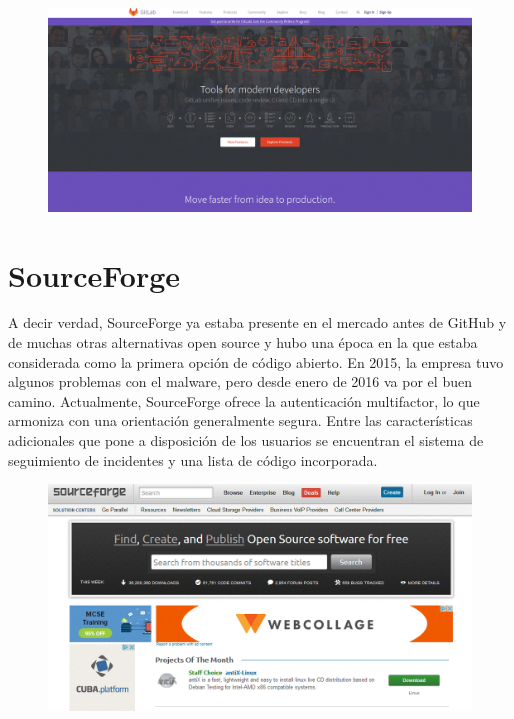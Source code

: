 \documentclass[12pt,letterpaper]{article}
\begin{document}
\vspace*{-0.025in}
\begin{figure}[htb]
\begin{center}
\includegraphics[width=16cm]{./Imagenes/gitlabN}
\end{center}
\end{figure}

\section{SourceForge}
A decir verdad, SourceForge ya estaba presente en el mercado antes de GitHub y de muchas otras alternativas open source y hubo una época en la que estaba considerada como la primera opción de código abierto. En 2015, la empresa tuvo algunos problemas con el malware, pero desde enero de 2016 va por el buen camino. Actualmente, SourceForge ofrece la autenticación multifactor, lo que armoniza con una orientación generalmente segura. Entre las características adicionales que pone a disposición de los usuarios se encuentran el sistema de seguimiento de incidentes y una lista de código incorporada.

\vspace*{-0.025in}
\begin{figure}[htb]
\begin{center}
\includegraphics[width=16cm]{./Imagenes/2}
\end{center}
\end{figure}
\end{document}
